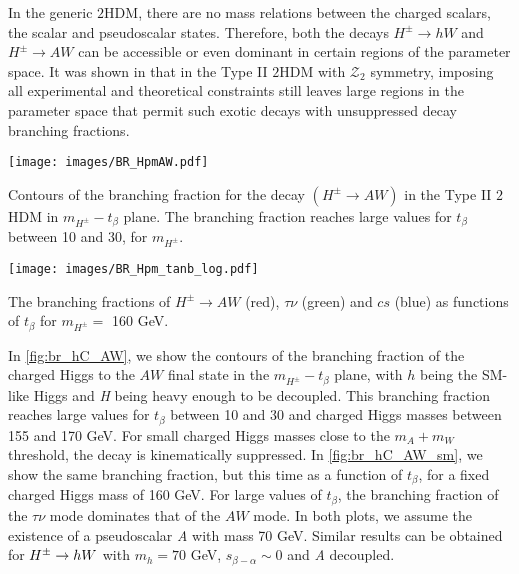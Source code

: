 In the generic $2$HDM, there are no mass relations between the charged scalars, the scalar and pseudoscalar states. Therefore, both the decays $H^{\pm} \rightarrow h W$ and $H^{\pm} \rightarrow A W$ can be accessible or even dominant in certain regions of the parameter space. It was shown in \cite{Coleppa:2013dya} that in the Type II $2$HDM with $\mathcal{Z}_2$ symmetry, imposing all experimental and theoretical constraints still leaves large regions in the parameter space that permit such exotic decays with unsuppressed decay branching fractions. 
\begin{marginfigure}[-5in]
 	\texttt{[image: images/BR\_HpmAW.pdf]}
    \caption{Contours of the branching fraction for the decay $( H^{\pm} \rightarrow AW)$ in the Type II $2$HDM in $m_{H^\pm}-t_{\beta}$ plane. The branching fraction reaches large values for $t_\beta$ between 10 and 30, for $m_{H^\pm}$.}
    \label{fig:br_hC_AW}
\end{marginfigure}

\begin{marginfigure}[-1.2in]
 	\texttt{[image: images/BR\_Hpm\_tanb\_log.pdf]}
    \caption{The branching fractions of $H^{\pm} \rightarrow AW$ (red), $\tau\nu$ (green) and $cs$ (blue) as functions of $t_{\beta}$ for $m_{H^\pm} =$ 160 GeV.}
\label{fig:br_hC_AW_sm}
\end{marginfigure}

In \autoref{fig:br_hC_AW}, we show the contours of the branching fraction of the charged Higgs to the $AW$ final state in the $m_{H^{\pm}}-t_{\beta}$ plane, with $h$ being the SM-like Higgs and \emph{H} being heavy enough to be decoupled. This branching fraction reaches large values for $t_{\beta}$ between 10 and 30 and charged Higgs masses between 155 and 170 GeV. For small charged Higgs masses close to the $m_A + m_W$ threshold, the decay is kinematically suppressed. In \autoref{fig:br_hC_AW_sm}, we show the same branching fraction, but this time as a function of $t_\beta$, for a fixed charged Higgs mass of 160 GeV. For large values of $t_{\beta}$, the branching fraction of the $\tau\nu$ mode dominates that of the $AW$ mode. In both plots, we assume the existence of a pseudoscalar \emph{A} with mass 70 GeV. Similar results can be obtained for $H^{\pm} \rightarrow h W$ with $m_{h} = 70$ GeV,  $s_{\beta-\alpha}\sim 0$ and \emph{A} decoupled. 


